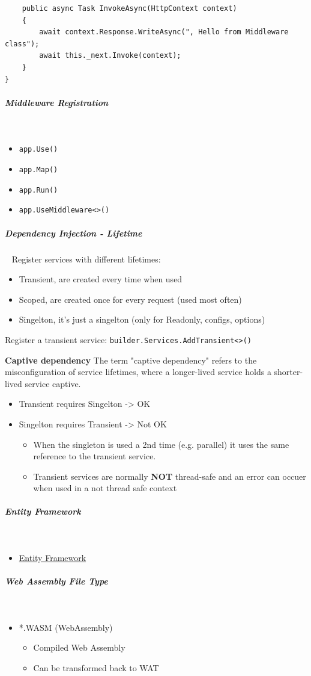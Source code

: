 \documentclass[11pt,twoside,landscape]{article}
\begin{document}
\begin{multicols}{3}
\begin{verbatim}
    public async Task InvokeAsync(HttpContext context)
    {
        await context.Response.WriteAsync(", Hello from Middleware class");
        await this._next.Invoke(context);
    }
}
\end{verbatim}
\subparagraph{Middleware Registration} \
\label{sec:org25abf62}
\begin{itemize}
\item \texttt{app.Use()}
\item \texttt{app.Map()}
\item \texttt{app.Run()}
\item \texttt{app.UseMiddleware<>()}
\end{itemize}
\subparagraph{Dependency Injection - Lifetime} \
\label{sec:orgeae8a0f}
Register services with different lifetimes:
\begin{itemize}
\item Transient, are created every time when used
\item Scoped, are created once for every request (used most often)
\item Singelton, it's just a singelton (only for Readonly, configs, options)
\end{itemize}


Register a transient service: \texttt{builder.Services.AddTransient<>()}


\textbf{Captive dependency}
The term "captive dependency" refers to the misconfiguration of service lifetimes, where a longer-lived service holds a shorter-lived service captive.
\begin{itemize}
\item Transient requires Singelton -> OK
\item Singelton requires Transient -> Not OK
\begin{itemize}
\item When the singleton is used a 2nd time (e.g. parallel) it uses the same reference to the transient service.
\item Transient services are normally \textbf{NOT} thread-safe and an error can occuer when used in a not thread safe context
\end{itemize}
\end{itemize}
\subparagraph{Entity Framework} \
\label{sec:org4d656f1}
\begin{itemize}
\item \href{../../../roam/20220108180326-entity_framework.org}{Entity Framework}
\end{itemize}
\subparagraph{Web Assembly File Type} \
\label{sec:org28ec2a7}
\begin{itemize}
\item *.WASM (WebAssembly)
\begin{itemize}
\item Compiled Web Assembly
\item Can be transformed back to WAT
\end{itemize}


\end{itemize}
\end{multicols}
\end{document}
